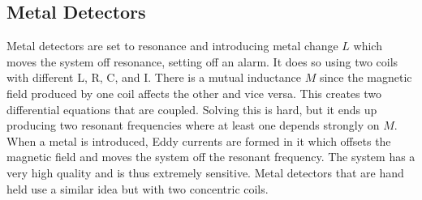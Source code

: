 \documentclass{article}
\begin{document}
\subsection{Metal Detectors}
Metal detectors are set to resonance and introducing metal change $L$ which moves the system off resonance, setting off an alarm.
It does so using two coils with different L, R, C, and I. There is a mutual inductance $M$ since the magnetic field produced by one 
coil affects the other and vice versa. This creates two differential equations that are coupled. Solving this is hard, but it ends up
producing two resonant frequencies where at least one depends strongly on $M$. When a metal is introduced, Eddy currents are formed in it 
which offsets the magnetic field and moves the system off the resonant frequency. The system has a very high quality and is thus extremely sensitive.
Metal detectors that are hand held use a similar idea but with two concentric coils.
\end{document}
